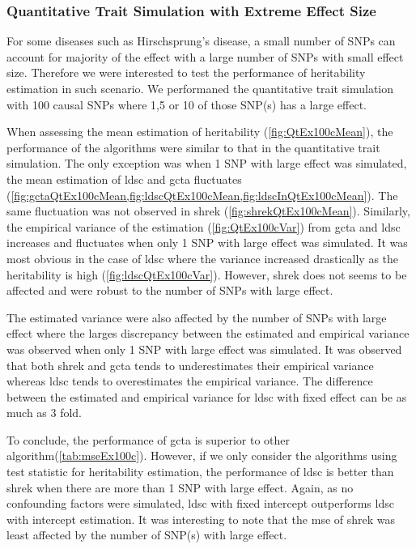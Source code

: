 		\subsubsection{Quantitative Trait Simulation with Extreme Effect Size}
		
		For some diseases such as Hirschsprung's disease, a small number of \glspl{SNP} can account for majority of the effect with a large number of \glspl{SNP} with small effect size. 
		Therefore we were interested to test the performance of heritability estimation in such scenario.
		We performaned the quantitative trait simulation with 100 causal \glspl{SNP} where 1,5 or 10 of those \gls{SNP}(s) has a large effect.
		
		When assessing the mean estimation of heritability (\cref{fig:QtEx100cMean}), the performance of the algorithms were similar to that in the quantitative trait simulation.
		The only exception was when 1 \gls{SNP} with large effect was simulated, the mean estimation of \gls{ldsc} and \gls{gcta} fluctuates (\cref{fig:gctaQtEx100cMean,fig:ldscQtEx100cMean,fig:ldscInQtEx100cMean}).
		The same fluctuation was not observed in \gls{shrek} (\cref{fig:shrekQtEx100cMean}). 
		Similarly, the empirical variance of the estimation (\cref{fig:QtEx100cVar}) from \gls{gcta} and \gls{ldsc} increases and fluctuates when only 1 \gls{SNP} with large effect was simulated.
		It was most obvious in the case of \gls{ldsc} where the variance increased drastically as the heritability is high (\cref{fig:ldscQtEx100cVar}).
		However, \gls{shrek} does not seems to be affected and were robust to the number of \glspl{SNP} with large effect. 
		
		The estimated variance were also affected by the number of \glspl{SNP} with large effect where the larges discrepancy between the estimated and empirical variance was observed when only 1 \gls{SNP} with large effect was simulated. 
		It was observed that both \gls{shrek} and \gls{gcta} tends to underestimates their empirical variance whereas \gls{ldsc} tends to overestimates the empirical variance. 
		The difference between the estimated and empirical variance for \gls{ldsc} with fixed effect can be as much as 3 fold. 
		
		To conclude, the performance of \gls{gcta} is superior to other algorithm(\cref{tab:mseEx100c}).
		However, if we only consider the algorithms using test statistic for heritability estimation, the performance of \gls{ldsc} is better than \gls{shrek} when there are more than 1 \gls{SNP} with large effect. 
		Again, as no confounding factors were simulated, \gls{ldsc} with fixed intercept outperforms \gls{ldsc} with intercept estimation.
		It was interesting to note that the \gls{mse} of \gls{shrek} was least affected by the number of \gls{SNP}(s) with large effect.
		   
